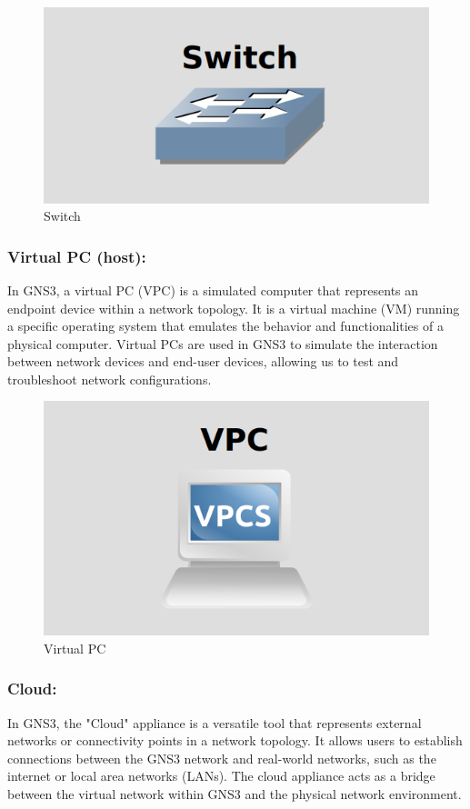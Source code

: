 \begin{figure}[h]
    \centering
    \includegraphics[width=0.7\linewidth]{Images/switch.png}
    \caption{Switch}
    \label{fig:example}
\end{figure}


\subsubsection{Virtual PC (host):}

In GNS3, a virtual PC (VPC) is a simulated computer that represents an endpoint device within a network topology. It is a virtual machine (VM) running a specific operating system that emulates the behavior and functionalities of a physical computer. Virtual PCs are used in GNS3 to simulate the interaction between network devices and end-user devices, allowing us to test and troubleshoot network configurations.

\begin{figure}[h]
    \centering
    \includegraphics[width=0.6\linewidth]{Images/vpc.png}
    \caption{Virtual PC}
    \label{fig:example}
\end{figure}

\subsubsection{Cloud:}

In GNS3, the "Cloud" appliance is a versatile tool that represents external networks or connectivity points in a network topology. It allows users to establish connections between the GNS3 network and real-world networks, such as the internet or local area networks (LANs). The cloud appliance acts as a bridge between the virtual network within GNS3 and the physical network environment.

